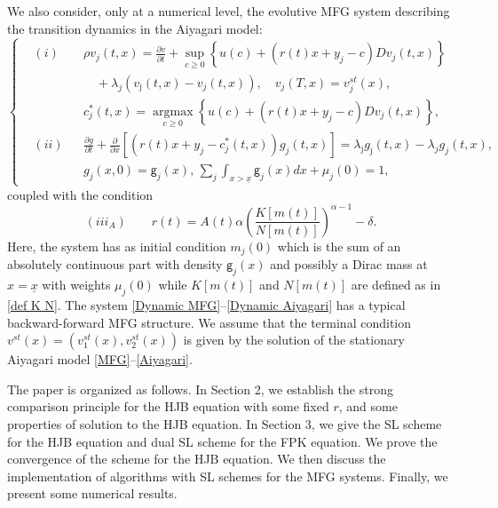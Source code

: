 \documentclass[11pt]{article}
\numberwithin{equation}{section}
\theoremstyle{Claim}
\newcommand{\pd}{\partial}
\newcommand{\ux}{{\underline x}}
\theoremstyle{plain}
\begin{document}
We also consider, only at a numerical level,  the evolutive  MFG  system describing the transition dynamics in the Aiyagari model:
\begin{equation}\label{Dynamic MFG}
	\left\{\begin{aligned}
		&(i)&&\rho v_j(t,x) = \frac{\pd v}{\pd t}+\sup_{c\ge 0} \left\{ u(c) +(r(t)x + y_j - c)Dv_j(t,x) \right\}\\
		&&&\quad +\lambda_j(v_{\bar \jmath}(t,x)-v_j(t,x)),\quad v_j(T,x)=v^{{st}}_j(x),\\
		&&&c_{j}^*(t,x)=\mathop{\arg \max}\limits_{c\ge 0} \left\{ u(c) +(r(t) x + y_j - c)Dv_j(t,x) \right\},\\
		&(ii)&&\frac{\pd g}{\pd t}+ \frac{\partial}{\partial x} \left[ \left(r(t) x + y_j - c_{j}^*(t,x)\right) g_j(t,x) \right]=\lambda_{\bar \jmath}g_{\bar \jmath}(t,x) -\lambda_jg_j(t,x),\\
		&&& g_j(x,0)=\mathsf{g}_j(x),\,\sum_j\int_{x>\ux}\mathsf{g}_j(x)dx+\mu_j(0)=1,
	\end{aligned}\right.
\end{equation}
coupled with the condition
	\begin{equation}\label{Dynamic Aiyagari}
		(iii_A)\qquad r(t) = A(t)\alpha \left( \frac{K[m(t)]}{N[m(t)]} \right)^{\alpha - 1} - \delta.
	\end{equation}	
	Here, the system has as initial condition $m_j(0)$ which is the sum of  an absolutely continuous part with density $\mathsf{g}_j(x)$ and possibly a Dirac mass at $x=\ux$ with weights $\mu_j(0)$ while $K[m(t)]$ and $N[m(t)]$ are defined as in \eqref{def K N}. The system \eqref{Dynamic MFG}–\eqref{Dynamic Aiyagari} has a typical backward-forward MFG structure.
	We assume that the terminal condition $v^{st}(x) = (v_1^{st}(x), v_2^{st}(x))$ is given by the solution of the stationary Aiyagari model \eqref{MFG}–\eqref{Aiyagari}. \par




	
	The paper is organized as follows. In Section 2, we establish the strong comparison principle for the HJB equation with some fixed $r$, and some properties of solution to the HJB equation. In Section 3, we give the SL scheme for the HJB equation and dual SL scheme for the FPK equation. We prove the convergence of the scheme for the HJB equation. We then discuss the implementation of algorithms with SL schemes for the MFG systems. Finally, we present some numerical results. 
\end{document}
